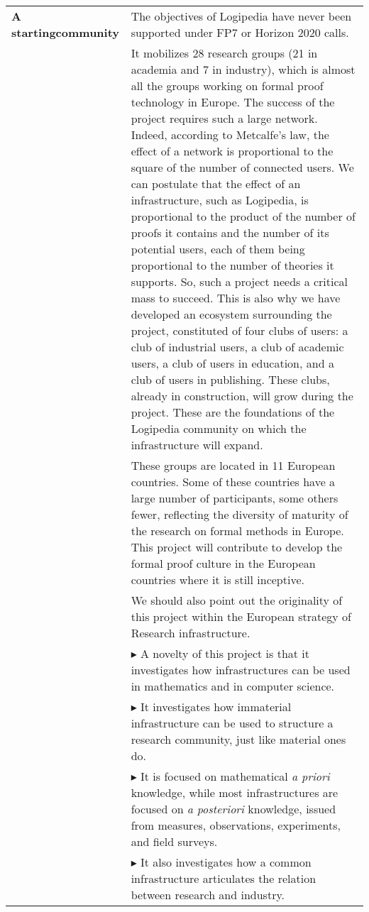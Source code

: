 \begin{longtable}{|p{}|p{}|}
{\bf A starting\newline community} & The objectives of Logipedia have never
been supported under FP7 or Horizon 2020 calls.\\
& \hspace{0.4cm} It mobilizes 28 research groups (21 in academia and 7
in industry), which is almost all the groups working on formal proof
technology in Europe.  The success of the project requires such a
large network.  Indeed, according to Metcalfe's law, the effect of a
network is proportional to the square of the number of connected
users. We can postulate that the effect of an infrastructure, such as
Logipedia, is proportional to the product of the number of proofs it
contains and the number of its potential users, each of them being
proportional to the number of theories it supports. So, such a project
needs a critical mass to succeed. This is also why we have developed an
ecosystem surrounding the project, constituted of four clubs of users:
a club of industrial users, a club of academic users, a club of users
in education, and a club of users in publishing.
These clubs, already in construction, will grow during the project.  These
are the foundations of the Logipedia community on which the
infrastructure will expand.\\
& \hspace{0.4cm} These groups are located in 11 European countries.
Some of these countries have a large number of participants, some
others fewer, reflecting the diversity of maturity of the research on
formal methods in Europe. This project will contribute to develop the
formal proof
culture in the European countries where it is still inceptive.\\
& \hspace{0.4cm} We should also point out the originality of this
project within the
European strategy of Research infrastructure.\\
& $\blacktriangleright$ A novelty of this project is that it
investigates how infrastructures can be used in mathematics and in
computer science.\\
& $\blacktriangleright$ It investigates how immaterial infrastructure
can be used to structure a research community, just like material ones
do.\\
& $\blacktriangleright$ It is focused on mathematical {\em a priori}
knowledge, while most infrastructures are focused on {\em a
  posteriori} knowledge, issued from measures, observations,
experiments, and field surveys.\\
& $\blacktriangleright$ It also investigates how a common
infrastructure articulates the relation between research and industry.
\\
\hline


\end{longtable}
